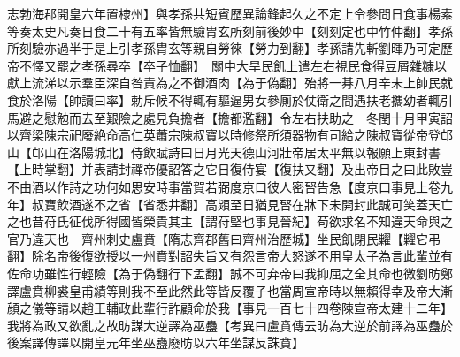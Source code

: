 志勃海郡開皇六年置棣州】與孝孫共短賓歷異論鋒起久之不定上令參問日食事楊素等奏太史凡奏日食二十有五率皆無驗胄玄所刻前後妙中【刻刻定也中竹仲翻】孝孫所刻驗亦過半于是上引孝孫胄玄等親自勞徠【勞力到翻】孝孫請先斬劉暉乃可定歷帝不懌又罷之孝孫尋卒【卒子恤翻】　關中大旱民飢上遣左右視民食得豆屑雜糠以獻上流涕以示羣臣深自咎責為之不御酒肉【為于偽翻】殆將一朞八月辛未上帥民就食於洛陽【帥讀曰率】勅斥候不得輒有驅逼男女參厠於仗衛之間遇扶老攜幼者輒引馬避之慰勉而去至艱險之處見負擔者【擔都濫翻】令左右扶助之　冬閏十月甲寅詔以齊梁陳宗祀廢絶命高仁英蕭宗陳叔寶以時修祭所須器物有司給之陳叔寶從帝登邙山【邙山在洛陽城北】侍飲賦詩曰日月光天德山河壯帝居太平無以報願上東封書【上時掌翻】并表請封禪帝優詔答之它日復侍宴【復扶又翻】及出帝目之曰此敗豈不由酒以作詩之功何如思安時事當賀若弼度京口彼人密唘告急【度京口事見上卷九年】叔寶飲酒遂不之省【省悉井翻】高熲至日猶見唘在牀下未開封此誠可笑蓋天亡之也昔苻氏征伐所得國皆榮貴其主【謂苻堅也事見晉紀】苟欲求名不知違天命與之官乃違天也　齊州刺史盧賁【隋志齊郡舊曰齊州治歷城】坐民飢閉民糶【糶它弔翻】除名帝後復欲授以一州賁對詔失旨又有怨言帝大怒遂不用皇太子為言此輩並有佐命功雖性行輕險【為于偽翻行下孟翻】誠不可弃帝曰我抑屈之全其命也微劉昉鄭譯盧賁柳裘皇甫績等則我不至此然此等皆反覆子也當周宣帝時以無賴得幸及帝大漸顔之儀等請以趙王輔政此輩行詐顧命於我【事見一百七十四卷陳宣帝太建十二年】我將為政又欲亂之故昉謀大逆譯為巫蠱【考異曰盧賁傳云昉為大逆於前譯為巫蠱於後案譯傳譯以開皇元年坐巫蠱廢昉以六年坐謀反誅賁】

